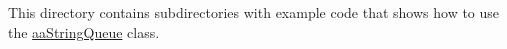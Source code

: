 \label{index_md_examples_README}%
%
This directory contains subdirectories with example code that shows how to use the \mbox{\hyperlink{classaa_string_queue}{aa\+String\+Queue}} class. 